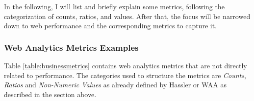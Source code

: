 In the following, I will list and briefly explain some metrics, following the categorization of counts, ratios, and values.
After that, the focus will be narrowed down to web performance and the corresponding metrics to capture it.




\subsubsection{Web Analytics Metrics Examples} %
\label{subsubsection:web_analytics_metrics_examples}

Table \ref{table:businessmetrics} contains web analytics metrics that are not directly related to performance.
The categories used to structure the metrics are \textit{Counts}, \textit{Ratios} and \textit{Non-Numeric Values} as already defined by Hassler or WAA as described in the section above.




